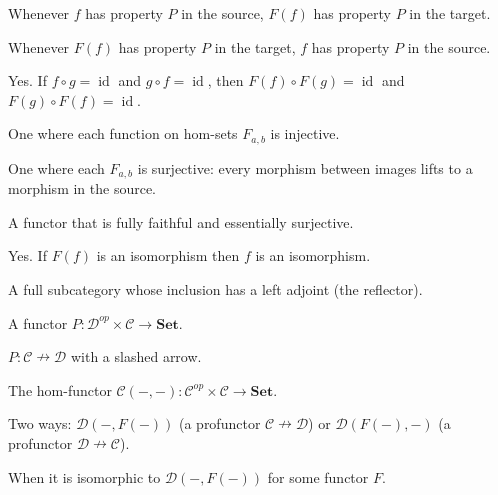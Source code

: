 \begin{exercisesbox}
\begin{qa}
       {Whenever $f$ has property $P$ in the source, $F(f)$ has property $P$ in
        the target.}

       {Whenever $F(f)$ has property $P$ in the target, $f$ has property $P$ in
        the source.}

       {Yes. If $f \circ g = \operatorname{id}$ and $g \circ f = \operatorname{id}$,
        then $F(f) \circ F(g) = \operatorname{id}$ and $F(g) \circ F(f) = \operatorname{id}$.}

       {One where each function on hom-sets $F_{a,b}$ is injective.}

       {One where each $F_{a,b}$ is surjective: every morphism between images
        lifts to a morphism in the source.}

       {A functor that is fully faithful and essentially surjective.}

       {Yes. If $F(f)$ is an isomorphism then $f$ is an isomorphism.}

       {A full subcategory whose inclusion has a left adjoint (the reflector).}

       {A functor $P : \mathcal{D}^{op} \times \mathcal{C} \to \mathbf{Set}$.}

       {$P : \mathcal{C} \nrightarrow \mathcal{D}$ with a slashed arrow.}

       {The hom-functor $\mathcal{C}(-,-) : \mathcal{C}^{op} \times \mathcal{C} \to \mathbf{Set}$.}

       {Two ways: $\mathcal{D}(-,F(-))$ (a profunctor $\mathcal{C} \nrightarrow \mathcal{D}$)
        or $\mathcal{D}(F(-),-)$ (a profunctor $\mathcal{D} \nrightarrow \mathcal{C}$).}

       {When it is isomorphic to $\mathcal{D}(-,F(-))$ for some functor $F$.}


\end{qa}
\end{exercisesbox}
